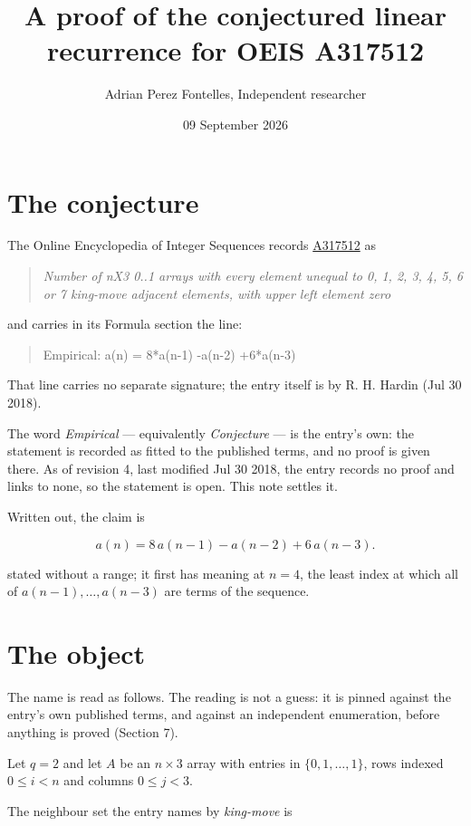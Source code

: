 \documentclass[11pt]{article}
\title{A proof of the conjectured linear recurrence for OEIS A317512}
\author{Adrian Perez Fontelles, Independent researcher}
\date{09 September 2026}
\theoremstyle{definition}
\begin{document}
\maketitle
\section{The conjecture}

The Online Encyclopedia of Integer Sequences records \href{https://oeis.org/A317512}{A317512} as

\begin{quote}\itshape Number of nX3 0..1 arrays with every element unequal to 0, 1, 2, 3, 4, 5, 6 or 7 king-move adjacent elements, with upper left element zero\end{quote}

and carries in its Formula section the line:

\begin{quote}\ttfamily Empirical: a(n) = 8*a(n-1) -a(n-2) +6*a(n-3)\end{quote}

That line carries no separate signature; the entry itself is by R. H. Hardin (Jul 30 2018).

The word {\itshape Empirical} --- equivalently {\itshape Conjecture} --- is the entry's own: the statement is recorded as fitted to the published terms, and no proof is given there. As of revision 4, last modified Jul 30 2018, the entry records no proof and links to none, so the statement is open. This note settles it.

Written out, the claim is

\[a(n) = 8\,a(n-1) - a(n-2) + 6\,a(n-3).\]

stated without a range; it first has meaning at $n = 4$, the least index at which all of $a(n-1),\dots,a(n-3)$ are terms of the sequence.

\section{The object}

The name is read as follows. The reading is not a guess: it is pinned against the entry's own published terms, and against an independent enumeration, before anything is proved (Section 7).

Let $q = 2$ and let $A$ be an $n \times 3$ array with entries in $\{0,1,\dots,1\}$, rows indexed $0 \le i < n$ and columns $0 \le j < 3$.

The neighbour set the entry names by {\itshape king-move} is
\end{document}
